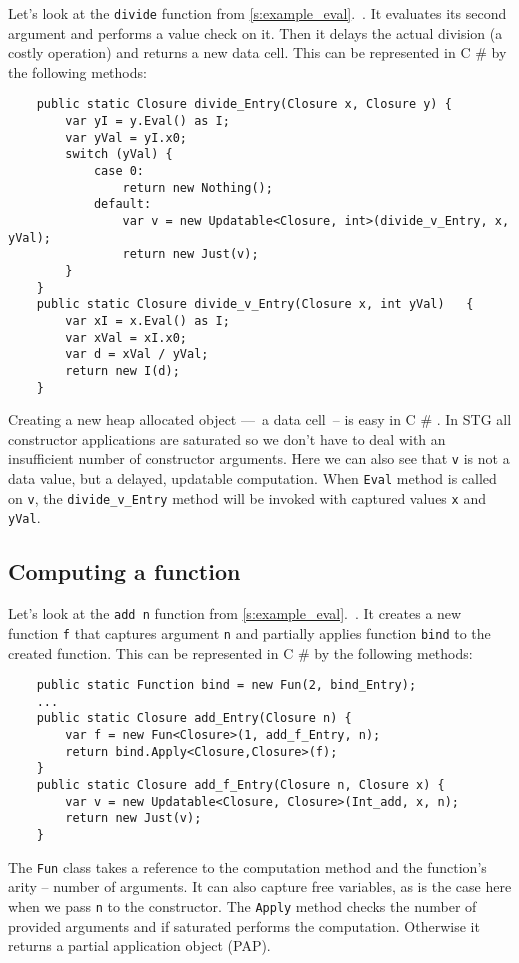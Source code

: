 \documentclass[en]{pracamgr}
\newcommand{\shrp}{%
  {\fontfamily{ppl}\selectfont\#%
  }}
\newcommand{\myref}[1]{\ref{#1}.~\textit{\nameref{#1}}}
\begin{document}
Let's look at the \texttt{divide} function from \myref{s:example_eval}.
It evaluates its second argument and performs a value check on it.
Then it delays the actual division (a costly operation) and returns a new data cell.
This can be represented in C\shrp{} by the following methods:

\begin{verbatim}
    public static Closure divide_Entry(Closure x, Closure y) {
        var yI = y.Eval() as I;
        var yVal = yI.x0;
        switch (yVal) {
            case 0:
                return new Nothing();
            default:
                var v = new Updatable<Closure, int>(divide_v_Entry, x, yVal);
                return new Just(v);
        }
    }
    public static Closure divide_v_Entry(Closure x, int yVal)   {
        var xI = x.Eval() as I;
        var xVal = xI.x0;
        var d = xVal / yVal;
        return new I(d);
    }
\end{verbatim}

Creating a new heap allocated object ––~a data cell~--
is easy in C\shrp{}. In STG all constructor applications are
saturated so we don't have to deal with an
insufficient number of constructor arguments. Here we can
also see that \texttt{v} is not a data value, but a delayed,
updatable computation. When \texttt{Eval} method is called
on \texttt{v}, the \verb|divide_v_Entry| method will be
invoked with captured values \texttt{x} and \texttt{yVal}.

\subsection{Computing a function}

Let's look at the \texttt{add n} function from \myref{s:example_eval}.
It creates a new function \texttt{f} that captures argument \texttt{n}
and partially applies function \texttt{bind} to the created function.
This can be represented in C\shrp{} by the following methods:

\begin{verbatim}
    public static Function bind = new Fun(2, bind_Entry);
    ...
    public static Closure add_Entry(Closure n) {
        var f = new Fun<Closure>(1, add_f_Entry, n);
        return bind.Apply<Closure,Closure>(f);
    }
    public static Closure add_f_Entry(Closure n, Closure x) {
        var v = new Updatable<Closure, Closure>(Int_add, x, n);
        return new Just(v);
    }
\end{verbatim}

The \texttt{Fun} class takes a reference to the computation method
and the function's arity -- number of arguments.
It can also capture free variables,
as is the case here when we pass \texttt{n} to the constructor.
The \texttt{Apply} method checks the number of provided
arguments and if saturated performs the computation.
Otherwise it returns a partial application object (PAP).
\end{document}
